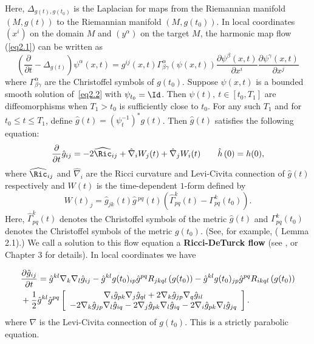 Here, $\Delta_{g\left(  t\right) ,g(t_0) }$ is the Laplacian for
maps from the Riemannian manifold $(M,g(t))$ to the Riemannian
manifold $(M,g(t_0))$. In local coordinates $(x^i)$ on the domain
$M$ and $(y^\alpha)$ on the target $M$, the harmonic map flow
(\ref{eq2.1}) can be written as
\begin{equation}
\left( \frac{\partial}{\partial t}-\Delta_{g\left(  t\right)
}\right) \psi^{\alpha}\left(  x,t\right)  =g^{ij}\left( x,t\right)
\Gamma _{\beta\gamma}^{\alpha}\left(  \psi\left(  x,t\right) \right)
\frac {\partial\psi^{\beta}\left(  x,t\right)  }{\partial
x^{i}}\frac{\partial \psi^{\gamma}\left(  x,t\right)  }{\partial
x^{j}} \label{eq2.2}
\end{equation}
where $\Gamma_{\beta\gamma}^{\alpha}$ are the Christoffel symbols of
$g(t_0)$. Suppose $\psi\left(x, t\right)$ is a bounded smooth
solution of~\ref{eq2.2} with $\psi_{t_0}=\Id$. Then $\psi\left(
t\right),\ t \in[t_0, T_1]$ are diffeomorphisms when $T_{1}>t_0$ is
sufficiently close to $t_0$. For any such $T_1$ and for $t_0 \leq t
\leq T_1$, define $\hat{g}\left( t\right) =\left(
\psi_{t}^{-1}\right) ^{\ast}g\left( t\right)$. Then $\hat g(t)$
satisfies the following equation:
\begin{equation}\label{RDfloweqn}
\frac{\partial}{\partial t}\hat{g}_{ij} =-2\widehat{\Ric}_{ij}+\hat{\nabla} _{i}W_{j}(t)+\hat{\nabla}_{j}W_{i}(t) \quad
\quad \hat{h}\left( 0\right) =h(0),
\end{equation}
where $\widehat{\Ric}_{ij}$ and $\hat{\nabla}_{i}$ are the
Ricci curvature and Levi-Civita connection of $\hat{g}(t)$
respectively and $W(t)$ is the time-dependent $1$-form defined by
\[
W(t) _{j}=\hat{g}_{jk}(t)\hat{g}\,^{pq}(t)\left(
\hat{\Gamma}_{pq}^{k}(t)-\Gamma_{pq}^{k}(t_0)   \right).
\]
Here, $\hat{\Gamma}_{pq}^{k}(t)$ denotes the Christoffel symbols of
the metric $\hat g(t)$ and $\Gamma_{pq}^k(t_0)$ denotes the
Christoffel symbols of the metric $g(t_0)$. (See, for example,
(\cite{Shi1} Lemma 2.1).)
 We call a solution to this flow equation a
 \textbf{Ricci-DeTurck flow} (see \cite{DeTurck}, or \cite{ChowKnopf}
Chapter 3 for details). In local coordinates we have

\begin{align}
& \frac{\partial\hat{g}_{ij}}{\partial t}  =\hat{g}^{kl}\nabla
_{k}\nabla_{l}\hat{g}_{ij}-\hat{g}^{kl}g(t_0)_{ ip}\hat{g}^{pq}R_{jk
ql}\left(  g(t_0)\right)  -\hat{g} ^{kl}g(t_0)_{
jp}\hat{g}^{pq}R_{ik ql}\left(  g(t_0)\right) \nonumber
\\
&  +\frac{1}{2}\hat{g}^{kl}\hat{g}^{pq}\left[
\begin{array}
[c]{c} \nabla_{i}\hat{g}_{pk}\nabla_{ j}\hat{g}_{ql}+2\nabla
_{k}\hat{g}_{jp}\nabla_{ q}\hat{g}_{il}\\
-2\nabla_{k}\hat{g}_{jp}\nabla_{l}\hat{g}_{iq}-2\nabla_{
j}\hat{g}_{pk}\nabla_{l}\hat{g}_{iq}-2\nabla_{ i}\hat
{g}_{pk}\nabla_{l}\hat{g}_{jq}
\end{array}
\right]  . \label{eqRcDeTurck}
\end{align}
where $\nabla$ is the Levi-Civita connection of $g(t_0)$. This is a
strictly parabolic equation.


